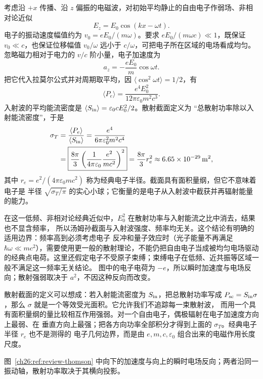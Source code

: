 {考虑沿 $+x$ 传播、沿 $z$ 偏振的电磁波，对初始平均静止的自由电子作弱场、非相对论近似
\begin{equation}
  E_z=E_0\cos(kx-\omega t).
\end{equation}
电子的振动速度幅值约为 $v_0=eE_0/(m\omega)$。要求 $eE_0/(m\omega c)\ll1$，既保证 $v_0\ll c$，也保证位移幅值 $v_0/\omega$ 远小于 $c/\omega$，可把电子所在区域的电场看成均匀。忽略磁力相对于电力的
$v/c$ 阶小量，电子加速度为
\begin{equation}
  a_z=-\frac{eE_0}{m}\cos\omega t.
\end{equation}
把它代入拉莫尔公式并对周期取平均，因 $\langle\cos^2\omega t\rangle=1/2$，有
\begin{equation}
  \langle P_e\rangle=\frac{e^4E_0^2}{12\pi\varepsilon_0m^2c^3}.
\end{equation}
入射波的平均能流密度是 $\langle S_{\rm in}\rangle=\varepsilon_0cE_0^2/2$。散射截面定义为
“总散射功率除以入射能流密度”，于是
\begin{align}
  \sigma_T
  &=\frac{\langle P_e\rangle}{\langle S_{\rm in}\rangle}
  =\frac{e^4}{6\pi\varepsilon_0^2m^2c^4}
  \\
  &=\boxed{\frac{8\pi}{3}\left(\frac{1}{4\pi\varepsilon_0}
  \frac{e^2}{mc^2}\right)^2}
  =\frac{8\pi}{3}r_e^2
  \approx\SI{6.65e-29}{m^2},
\end{align}
其中 $r_e=e^2/(4\pi\varepsilon_0mc^2)$ 称为经典电子半径。截面具有面积量纲，但它不意味着电子是
半径 $\sqrt{\sigma_T/\pi}$ 的实心小球；它衡量的是电子从入射波中截获并再辐射能量的能力。

在这一低频、非相对论经典近似中，$E_0^2$ 在散射功率与入射能流之比中消去，结果也不显含频率，
所以汤姆孙截面与入射波强度、频率均无关。这个结论有明确的适用边界：频率高到必须考虑电子
反冲和量子效应时（光子能量不再满足 $\hbar\omega\ll mc^2$），需要使用更一般的散射理论，不能仍把自由电子当成被均匀电场驱动的经典点电荷。这里还假定电子不受原子束缚；束缚电子在低频、近共振等区域一般不满足这一频率无关结论。
图中的电子电荷为 $-e$，所以瞬时加速度与电场反向；散射强弱取决于 $a^2$，不因这种反向而改变。

散射截面的定义可以想成：若入射能流密度为 $S_{\rm in}$，把总散射功率写成
$P_{\rm sc}=S_{\rm in}\sigma$，那么 $\sigma$ 就是一个等效受光面积。它允许我们不追踪每一束散射波，
而用一个具有面积量纲的量比较相互作用强弱。对一个自由电子，偶极辐射在电子加速度方向上最弱、在
垂直方向上最强；把各方向功率全部积分才得到上面的 $\sigma_T$。经典电子半径 $r_e$ 也不是测得的
电子几何边界，而是由 $e,m,c,\varepsilon_0$ 组合出来的电磁作用长度尺度。

图~\ref{ch26:ref:review-thomson} 中向下的加速度与向上的瞬时电场反向；两者沿同一振动轴，散射功率取决于其横向投影。

}
